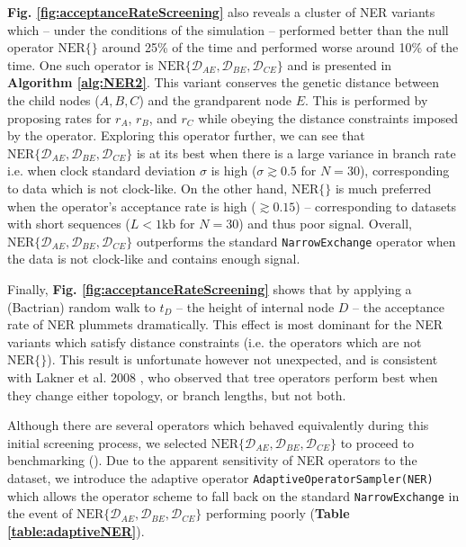 \documentclass[10pt,letterpaper]{article}
\begin{document}
\textbf{Fig. \ref{fig:acceptanceRateScreening}} also reveals a cluster of NER variants which -- under the conditions of the simulation --  performed better than the null operator $\text{NER}\{\}$ around 25\% of the time and performed worse around 10\% of the time. 
One such operator is  $\text{NER}\{\mathcal{D}_{AE}, \mathcal{D}_{BE}, \mathcal{D}_{CE}\}$ and is presented in \textbf{Algorithm \ref{alg:NER2}}. 
This variant conserves the genetic distance between the child nodes ($A, B, C$) and the grandparent node $E$. This is performed by proposing rates for $r_A$, $r_B$, and $r_C$ while obeying the distance constraints imposed by the operator. Exploring this operator further, we can see that $\text{NER}\{\mathcal{D}_{AE}, \mathcal{D}_{BE}, \mathcal{D}_{CE}\}$ is at its best when there is a large variance in branch rate i.e. when clock standard deviation $\sigma$ is high ($\sigma \gtrsim 0.5$ for $N=30$), corresponding to data which is not clock-like. On the other hand, $\text{NER}\{\}$ is much preferred when the operator's acceptance rate is high ($\gtrsim 0.15$) -- corresponding to datasets with short sequences ($L < 1$kb for $N=30$) and thus poor signal.  
Overall, $\text{NER}\{\mathcal{D}_{AE}, \mathcal{D}_{BE}, \mathcal{D}_{CE}\}$ outperforms the standard \texttt{NarrowExchange} operator when the data is not clock-like and contains enough signal. 




Finally, \textbf{Fig. \ref{fig:acceptanceRateScreening}} shows that by applying a (Bactrian) random walk to $t_D$ -- the height of internal node $D$ -- the acceptance rate of NER plummets dramatically. 
This effect is most dominant for the NER variants which satisfy distance constraints (i.e. the operators which are not $\text{NER}\{\}$). This result is unfortunate however not unexpected, and is consistent with Lakner et al. 2008 \cite{lakner2008efficiency}, who observed that tree operators perform best when they change either topology, or branch lengths, but not both.





Although there are several operators which behaved equivalently during this initial screening process, we selected $\text{NER}\{\mathcal{D}_{AE}, \mathcal{D}_{BE}, \mathcal{D}_{CE}\}$ to proceed to benchmarking (\textbf{}).
Due to the apparent sensitivity of NER operators to the dataset, we introduce the adaptive operator \texttt{AdaptiveOperatorSampler(NER)} which allows the operator scheme to fall back on the standard \texttt{NarrowExchange} in the event of $\text{NER}\{\mathcal{D}_{AE}, \mathcal{D}_{BE}, \mathcal{D}_{CE}\}$ performing poorly (\textbf{Table \ref{table:adaptiveNER}}).
\end{document}
